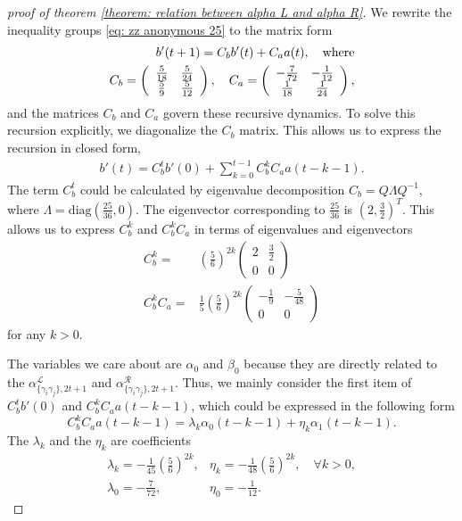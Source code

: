 \documentclass{article}
\newcommand{\alpl}{\alpha_{\{\gamma_i\gamma_j\}, 2t+1}^{\mathscr{L}}}
\newcommand{\alpr}{\alpha_{\{\gamma_i\gamma_j\}, 2t+1}^{\mathscr{R}}}
\begin{document}
\begin{proof}[proof of theorem \ref{theorem: relation between alpha L and alpha R}]
    We rewrite the inequality groups \eqref{eq: zz anonymous 25} to the matrix form
    \begin{align}
        b^{\prime}(t+1)=C_b b^{\prime}(t)+C_a a(t), \quad \text{where}\\
        C_b=\left(\begin{array}[15pt]{c c}
        \frac{5}{18} & \frac{5}{24} \\ 
        \frac{5}{9} & \frac{5}{12}
        \end{array}\right), \quad C_a=\left(\begin{array}{cc}
        -\frac{7}{72} & -\frac{1}{12} \\
        \frac{1}{18} & \frac{1}{24}
        \end{array}\right),
    \end{align}
    and the matrices $C_b$ and $C_a$ govern these recursive dynamics. To solve this recursion explicitly, we diagonalize the $C_b$ matrix. This allows us to express the recursion in closed form,
    \begin{align}
    b'(t)=C_b^t b'(0)+\sum_{k=0}^{t-1}C_b^kC_aa(t-k-1).
    \end{align}
The term $C_b^t$ could be calculated by eigenvalue decomposition $C_b=Q \Lambda Q^{-1}$, where $\Lambda=\text{diag}(\frac{25}{36},0)$. The eigenvector corresponding to $\frac{25}{36}$ is $(2, \frac{3}{2})^T$. This allows us to express $C_b^k$ and $C_b^kC_a$ in terms of eigenvalues and eigenvectors
\begin{align}
    C_b^k=&\left(\frac{5}{6}\right)^{2k}\begin{pmatrix}
2 & \frac{3}{2} \\
0 & 0
\end{pmatrix}\\
C_b^kC_a =& \frac{1}{5}\left(\frac{5}{6}\right)^{2k}\begin{pmatrix}
-\frac{1}{9} & -\frac{5}{48} \\
0 & 0
\end{pmatrix}
\end{align}
for any $k>0$. 

The variables we care about are $\alpha_0$ and $\beta_0$ because they are directly related to the $\alpl$ and $\alpr$. Thus, we mainly consider the first item of $C_b^t b'(0)$ and $C_b^kC_aa(t-k-1)$, which could be expressed in the following form
\begin{equation}
    C_b^kC_aa(t-k-1) = \lambda_k \alpha_0(t-k-1)+\eta_k \alpha_1(t-k-1).
\end{equation}
The $\lambda_k$ and the $\eta_k$ are coefficients 
\begin{equation}
    \begin{array}{ll}
\lambda_k=-\frac{1}{45}\left(\frac{5}{6}\right)^{2 k}, & \eta_k=-\frac{1}{48}\left(\frac{5}{6}\right)^{2 k}, \quad \forall k>0,  \\
\lambda_0=-\frac{7}{72}, & \eta_0=-\frac{1}{12}.
\end{array}
\end{equation}


\end{proof}
\end{document}
